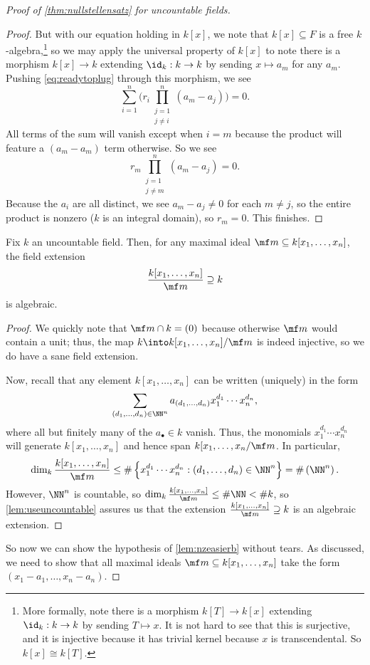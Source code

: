 \begin{proof}[Proof of \autoref{thm:nullstellensatz} for uncountable fields]
\begin{proof}
		But with our equation holding in $k[x]$, we note that $k[x]\subseteq F$ is a free $k$-algebra,\footnote{More formally, note there is a morphism $k[T]\to k[x]$ extending $\id_k:k\to k$ by sending $T\mapsto x$. It is not hard to see that this is surjective, and it is injective because it has trivial kernel because $x$ is transcendental. So $k[x]\cong k[T]$.} so we may apply the universal property of $k[x]$ to note there is a morphism $k[x]\to k$ extending $\id_k:k\to k$ by sending $x\mapsto a_m$ for any $a_m$. Pushing \autoref{eq:readytoplug} through this morphism, we see
		\[\sum_{i=1}^n\Bigg(r_i\prod_{\substack{j=1\\j\ne i}}^n(a_m-a_j)\Bigg)=0.\]
		All terms of the sum will vanish except when $i=m$ because the product will feature a $(a_m-a_m)$ term otherwise. So we see
		\[r_m\prod_{\substack{j=1\\j\ne m}}^n(a_m-a_j)=0.\]
		Because the $a_i$ are all distinct, we see $a_m-a_j\ne0$ for each $m\ne j$, so the entire product is nonzero ($k$ is an integral domain), so $r_m=0$. This finishes.
	\end{proof}
	\begin{corollary} \label{cor:forcealgebraic}
		Fix $k$ an uncountable field. Then, for any maximal ideal $\mf m\subseteq k[x_1,\ldots,x_n]$, the field extension
		\[\frac{k[x_1,\ldots,x_n]}{\mf m}\supseteq k\]
		is algebraic.
	\end{corollary}
	\begin{proof}
		We quickly note that $\mf m\cap k=(0)$ because otherwise $\mf m$ would contain a unit; thus, the map $k\into k[x_1,\ldots,x_n]/\mf m$ is indeed injective, so we do have a sane field extension.
		
		Now, recall that any element $k[x_1,\ldots,x_n]$ can be written (uniquely) in the form
		\[\sum_{(d_1,\ldots,d_n)\in\NN^n}a_{(d_1,\ldots,d_n)}x_1^{d_1}\cdots x_n^{d_n},\]
		where all but finitely many of the $a_\bullet\in k$ vanish. Thus, the monomials $x_1^{d_1}\cdots x_n^{d_n}$ will generate $k[x_1,\ldots,x_n]$ and hence span $k[x_1,\ldots,x_n/\mf m$. In particular,
		\[\dim_k\frac{k[x_1,\ldots,x_n]}{\mf m}\le\#\left\{x_1^{d_1}\cdots x_n^{d_n}:(d_1,\ldots,d_n)\in\NN^n\right\}=\#\left(\NN^n\right).\]
		However, $\NN^n$ is countable, so $\dim_k\frac{k[x_1,\ldots,x_n]}{\mf m}\le\#\NN<\#k$, so \autoref{lem:useuncountable} assures us that the extension $\frac{k[x_1,\ldots,x_n]}{\mf m}\supseteq k$ is an algebraic extension.
	\end{proof}
	So now we can show the hypothesis of \autoref{lem:nzeasierb} without tears. As discussed, we need to show that all maximal ideals $\mf m\subseteq k[x_1,\ldots,x_n]$ take the form $(x_1-a_1,\ldots,x_n-a_n)$.
	

\end{proof}

